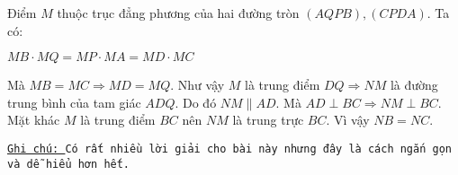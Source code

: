 \documentclass[12pt,a4paper]{article}
\begin{document}
Điểm $M$ thuộc trục đẳng phương của hai đường tròn $(AQPB),(CPDA)$. Ta có:
\begin{center}
	$MB\cdot{MQ}=MP\cdot{MA}=MD\cdot{MC}$
\end{center}

Mà $MB=MC\Rightarrow{MD=MQ}$. Như vậy $M$ là trung điểm $DQ\Rightarrow{NM}$ là đường trung bình của tam giác $ADQ$. Do đó $NM\parallel{AD}$. Mà $AD\perp{BC}\Rightarrow{NM}\perp{BC}$. Mặt khác $M$ là trung điểm $BC$ nên $NM$ là trung trực $BC$. Vì vậy $NB=NC$.\\

\begin{flushleft}
	\texttt{\underline{Ghi chú: }Có rất nhiều lời giải cho bài này nhưng đây là cách ngắn gọn và dễ hiểu hơn hết.}
\end{flushleft}
\end{document}
